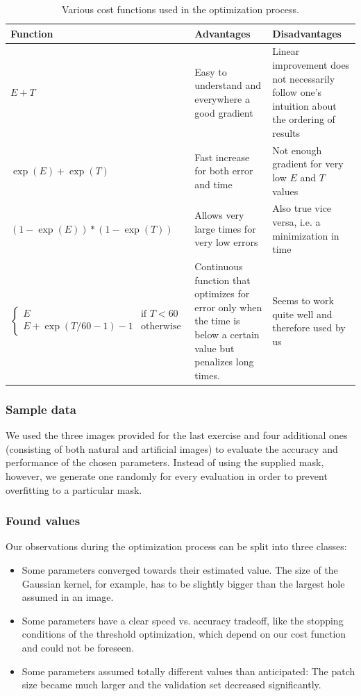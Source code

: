 \documentclass[10pt,conference,compsocconf]{IEEEtran}
\begin{document}
\begin{table}
\centering
\begin{tabular}{|l|p{6cm}|p{6cm}|}
\hline
Function & Advantages & Disadvantages \\
\hline
$E + T$ & Easy to understand and everywhere a good gradient & Linear improvement does not necessarily follow one's intuition about the ordering of results \\
\hline
$\exp(E)+\exp(T)$ & Fast increase for both error and time & Not enough gradient for very low $E$ and $T$ values \\
\hline
$(1-\exp(E))*(1-\exp(T))$ & Allows very large times for very low errors & Also true vice versa, i.e. a minimization in time \\
\hline
$\begin{cases}
E & \text{if }T<60\\
E+\exp(T/60 - 1) - 1 & \text{otherwise}
\end{cases}$ & Continuous function that optimizes for error only when the time is below a certain value but penalizes long times. & Seems to work quite well and therefore used by us \\
\hline
\end{tabular}
\caption{Various cost functions used in the optimization process.}
\label{cost_functions}
\end{table}

\subsubsection{Sample data}
We used the three images provided for the last exercise and four additional ones (consisting of both natural and artificial images) to evaluate the accuracy and performance of the chosen parameters. Instead of using the supplied mask, however, we generate one randomly for every evaluation in order to prevent overfitting to a particular mask. 

\subsubsection{Found values}
Our observations during the optimization process can be split into three classes:
\begin{itemize}
\item Some parameters converged towards their estimated value. The size of the Gaussian kernel, for example, has to be slightly bigger than the largest hole assumed in an image.
\item Some parameters have a clear speed vs. accuracy tradeoff, like the stopping conditions of the threshold optimization, which depend on our cost function and could not be foreseen.
\item Some parameters assumed totally different values than anticipated: The patch size became much larger and the validation set decreased significantly.
\end{itemize}
\end{document}

